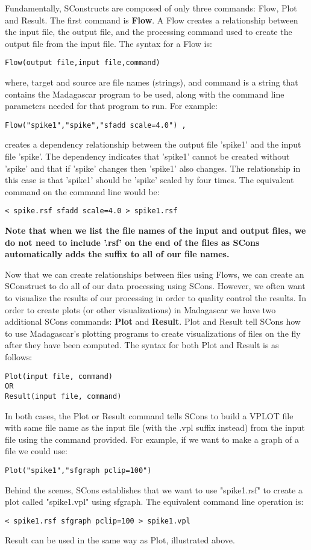 Fundamentally, SConstructs are composed of only three commands: Flow, Plot and Result.  The first command is \textbf{Flow}.  A Flow creates a relationship between the input file, the output file, and the processing command used to create the output file from the input file.  The syntax for a Flow is:

\begin{verbatim}
Flow(output file,input file,command)
\end{verbatim}
where, target and source are file names (strings), and command is a string that contains the Madagascar program to be used, along with the command line parameters needed for that program to run.  For example:
\begin{verbatim}
Flow("spike1","spike","sfadd scale=4.0") ,
\end{verbatim}
creates a dependency relationship between the output file 'spike1' and the input file 'spike'.  The dependency indicates that 'spike1' cannot be created without 'spike' and that if 'spike' changes then 'spike1' also changes.  The relationship in this case is that 'spike1' should be 'spike' scaled by four times.  The equivalent command on the command line would be: 
\begin{verbatim}
< spike.rsf sfadd scale=4.0 > spike1.rsf
\end{verbatim}
\textbf{Note that when we list the file names of the input and output files, we do not need to include '.rsf' on the end of the files as SCons automatically adds the suffix to all of our file names.}

Now that we can create relationships between files using Flows, we can create an SConstruct to do all of our data processing using SCons.   However, we often want to visualize the results of our processing in order to quality control the results. In order to create plots (or other visualizations) in Madagascar we have two additional SCons commands:  \textbf{Plot} and \textbf{Result}.  Plot and Result tell SCons how to use Madagascar's plotting programs to create visualizations of files on the fly after they have been computed.  The syntax for both Plot and Result is as follows:
\begin{verbatim}
Plot(input file, command)
OR
Result(input file, command)
\end{verbatim}
In both cases, the Plot or Result command tells SCons to build a VPLOT file with same file name as the input file (with the .vpl suffix instead) from the input file using the command provided.  For example, if we want to make a graph of a file we could use:
\begin{verbatim}
Plot("spike1","sfgraph pclip=100")
\end{verbatim}
Behind the scenes, SCons establishes that we want to use "spike1.rsf" to create a plot called "spike1.vpl" using sfgraph.  The equivalent command line operation is:
\begin{verbatim}
< spike1.rsf sfgraph pclip=100 > spike1.vpl
\end{verbatim}
Result can be used in the same way as Plot, illustrated above.  

